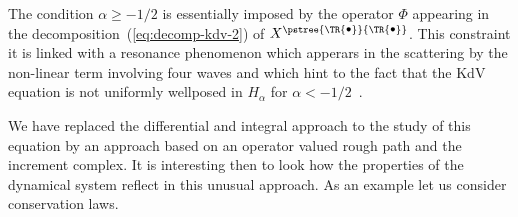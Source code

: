 \documentclass[a4paper]{article}
\newcommand{\1}{{\bf 1}}
\newcommand{\tsnode}{\TR{\raisebox{0.5pt}{\ensuremath{\scriptstyle\bullet}}}}
\newcommand{\aabb}{\pstree{\tsnode}{\tsnode}}
\begin{document}
The condition $\alpha \ge -1/2$ is essentially imposed by the operator
$\Phi$ appearing in the decomposition~(\ref{eq:decomp-kdv-2}) of
$X^{\aabb}$. This constraint it is linked with a resonance phenomenon
which apperars in the scattering by the non-linear term involving
four waves and which hint to the  fact that the KdV equation
is not uniformly wellposed in $H_\alpha$ for $\alpha < -1/2$~\cite{MR2018661,MR1969209}.

We have replaced the differential and integral approach to the study of this equation by an approach based on an operator valued rough path and the increment complex. It is interesting then to look how the properties of the dynamical system reflect in this unusual approach. As an example let us consider conservation laws.
\end{document}
